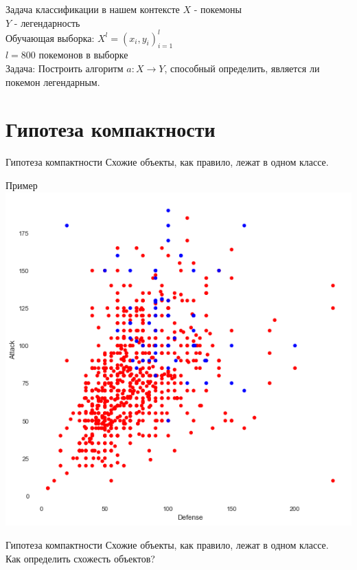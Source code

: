 \documentclass[10pt]{beamer}
\begin{document}
\begin{frame}{Задача классификации в нашем контексте}
	$X$ - покемоны \\
	$Y$ - легендарность \\
	Обучающая выборка: ${X^l = (x_i, y_i)_{i=1}^l}$ \\ 
	$l = 800$ покемонов в выборке\\
	\bigbreak
	\alert{Задача}: Построить алгоритм ${a \colon X \rightarrow Y}$, способный определить, является ли покемон легендарным.
\end{frame}

\section{Гипотеза компактности}

\begin{frame}{Гипотеза компактности}
    \centering
 	Схожие объекты, как правило, лежат в одном классе.\\
\end{frame}

\begin{frame}{Пример}
    \centering
	\includegraphics[width=\linewidth,height=0.8 \textheight,keepaspectratio]{images/attack_vs_defense}
\end{frame}

\begin{frame}{Гипотеза компактности}
	Схожие объекты, как правило, лежат в одном классе.\\
	\bigbreak
	Как определить \alert{схожесть} объектов?\\
\end{frame}
\end{document}
